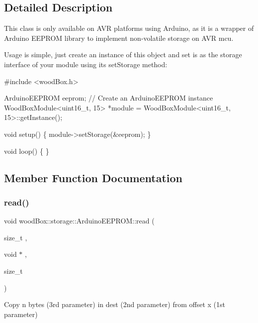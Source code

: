 \subsection{Detailed Description}
This class is only available on A\+VR platforms using Arduino, as it is a wrapper of Arduino E\+E\+P\+R\+OM library to implement non-\/volatile storage on A\+VR mcu.

Usage is simple, just create an instance of this object and set is as the storage interface of your module using its set\+Storage method\+:


\begin{DoxyCode}
\textcolor{preprocessor}{#include <woodBox.h>}

ArduinoEEPROM eeprom; \textcolor{comment}{// Create an ArduinoEEPROM instance}
WoodBoxModule<uint16\_t, 15> *module = WoodBoxModule<uint16\_t, 15>::getInstance();

\textcolor{keywordtype}{void} setup() \{
  module->setStorage(&eeprom);
\}

\textcolor{keywordtype}{void} loop() \{
\}
\end{DoxyCode}
 

\subsection{Member Function Documentation}
\mbox{\label{classwood_box_1_1storage_1_1_arduino_e_e_p_r_o_m_a1b9deb25ea803456b5450f4e3782fd20}} 
\subsubsection{\texorpdfstring{read()}{read()}}
{\footnotesize\ttfamily void wood\+Box\+::storage\+::\+Arduino\+E\+E\+P\+R\+O\+M\+::read (\begin{DoxyParamCaption}\item[{size\+\_\+t}]{,  }\item[{void $\ast$}]{,  }\item[{size\+\_\+t}]{ }\end{DoxyParamCaption})\hspace{0.3cm}{\ttfamily [virtual]}}

Copy n bytes (3rd parameter) in dest (2nd parameter) from offset x (1st parameter)

